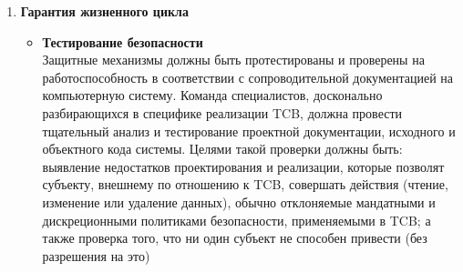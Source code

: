 \begin{enumerate}
\begin{enumerate}
\begin{enumerate}
\begin{enumerate}
\begin{itemize}
                    \item{\textbf{Анализ скрытых каналов связи}}\\
                    Разработчик системы должен провести тщательный поиск скрытых каналов хранения и определить (либо путем фактических измерений, либо путем инженерной оценки)
                    максимальную пропускную способность каждого выявленного канала.
                    \item{\textbf{Доверенное управление объектами}}\\
                    TCB должен поддерживать раздельные функции оператора и администратора системы. Функции, выполняемые в роли администратора безопасности, должны быть определены.
                    Административный персонал системы должен иметь возможность выполнять функции администратора безопасности только после выполнения отдельного проверяемого действия
                    по принятию роли администратора безопасности в системе. Функции, не связанные с безопасностью, которые могут выполняться в роли администратора безопасности,
                    должны быть строго ограничены теми, которые необходимы для эффективного выполнения роли безопасности.
                    \item{\textbf{Доверенное восстановление}}\\
                    Должны быть предусмотрены процедуры и/или механизмы, гарантирующие, что после сбоя или другого нарушения работы системы будет обеспечено восстановление без нарушения
                    механизмов защиты.
                \end{itemize}
                \item{\textbf{Гарантия жизненного цикла}}
                \begin{itemize}
                    \item{\textbf{Тестирование безопасности}}\\
                    Защитные механизмы должны быть протестированы и проверены на работоспособность в соответствии с сопроводительной документацией на компьютерную систему.  Команда специалистов,
                    досконально разбирающихся в специфике реализации TCB, должна провести тщательный анализ и тестирование проектной документации, исходного и объектного кода системы. Целями такой
                    проверки должны быть: выявление недостатков проектирования и реализации, которые позволят субъекту, внешнему по отношению к TCB, совершать действия (чтение, изменение или удаление данных),
                    обычно отклоняемые мандатными и дискреционными политиками безопасности, применяемыми в TCB; а также проверка того, что ни один субъект не способен привести (без разрешения на это)

\end{itemize}
\end{enumerate}
\end{enumerate}
\end{enumerate}
\end{enumerate}
